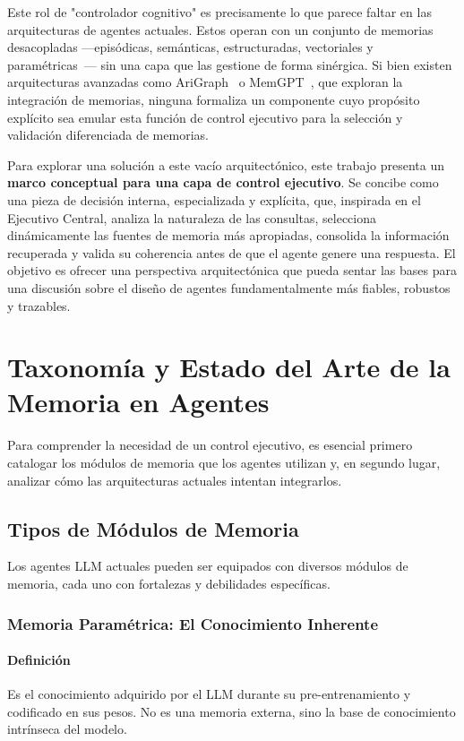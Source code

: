 \documentclass[conference]{IEEEtran}
\begin{document}
Este rol de "controlador cognitivo" es precisamente lo que parece faltar en las arquitecturas de agentes actuales. Estos operan con un conjunto de memorias desacopladas —episódicas, semánticas, estructuradas, vectoriales y paramétricas~\cite{zeng2024structural}— sin una capa que las gestione de forma sinérgica. Si bien existen arquitecturas avanzadas como AriGraph~\cite{anokhin2024arigraph} o MemGPT~\cite{packer2023memgpt}, que exploran la integración de memorias, ninguna formaliza un componente cuyo propósito explícito sea emular esta función de control ejecutivo para la selección y validación diferenciada de memorias.

Para explorar una solución a este vacío arquitectónico, este trabajo presenta un \textbf{marco conceptual para una capa de control ejecutivo}. Se concibe como una pieza de decisión interna, especializada y explícita, que, inspirada en el Ejecutivo Central, analiza la naturaleza de las consultas, selecciona dinámicamente las fuentes de memoria más apropiadas, consolida la información recuperada y valida su coherencia antes de que el agente genere una respuesta. El objetivo es ofrecer una perspectiva arquitectónica que pueda sentar las bases para una discusión sobre el diseño de agentes fundamentalmente más fiables, robustos y trazables.

\section{Taxonomía y Estado del Arte de la Memoria en Agentes}
\label{sec:memory_types}

Para comprender la necesidad de un control ejecutivo, es esencial primero catalogar los módulos de memoria que los agentes utilizan y, en segundo lugar, analizar cómo las arquitecturas actuales intentan integrarlos.

\subsection{Tipos de Módulos de Memoria}
Los agentes LLM actuales pueden ser equipados con diversos módulos de memoria, cada uno con fortalezas y debilidades específicas.

\subsubsection{Memoria Paramétrica: El Conocimiento Inherente}
\paragraph{Definición} Es el conocimiento adquirido por el LLM durante su pre-entrenamiento y codificado en sus pesos. No es una memoria externa, sino la base de conocimiento intrínseca del modelo.
\end{document}
